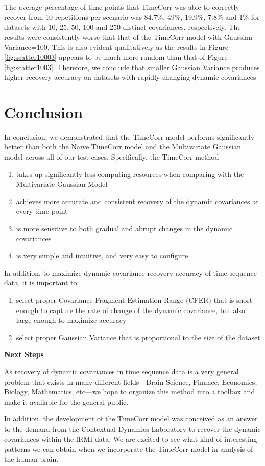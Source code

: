 \documentclass[12pt]{article}
\begin{document}
\begin{enumerate}
\begin{figure}[h]
\end{figure}
The average percentage of time points that TimeCorr was able to correctly recover from 10 repetitions per scenario was 84.7\%, 49\%, 19.9\%, 7.8\% and 1\% for datasets with 10, 25, 50, 100 and 250 distinct covariances, respectively. The results were consistently worse that that of the TimeCorr model with Gaussian Variance=100. This is also evident qualitatively as the results in Figure \ref{fig:scatter10003} appears to be much more random than that of Figure \ref{fig:scatter1003}. Therefore, we conclude that smaller Gaussian Variance produces higher recovery accuracy on datasets with rapidly changing dynamic covariances\par



\end{enumerate}

\section{Conclusion}
In conclusion, we demonstrated that the TimeCorr model performs significantly better than both the Naive TimeCorr model and the Multivariate Gaussian model across all of our test cases. Specifically, the TimeCorr method
\begin{enumerate}
\item takes up significantly less computing resources when comparing with the Multivariate Gaussian Model
\item achieves more accurate and consistent recovery of the dynamic covariances at every time point
\item is more sensitive to both gradual and abrupt changes in the dynamic covariances
\item is very simple and intuitive, and very easy to configure
\end{enumerate}
In addition, to maximize dynamic covariance recovery accuracy of time sequence data, it is important to:
\begin{enumerate}
\item select proper Covariance Fragment Estimation Range (CFER) that is short enough to capture the rate of change of the dynamic covariance, but also large enough to maximize accuracy
\item select proper Gaussian Variance that is proportional to the size of the dataset
\end{enumerate}

\textbf{Next Steps}\par
As recovery of dynamic covariances in time sequence data is a very general problem that exists in many different fields---Brain Science, Finance, Economics, Biology, Mathematics, etc---we hope to organize this method into a toolbox and make it available for the general public.\par
In addition, the development of the TimeCorr model was conceived as an answer to the demand from the Contextual Dynamics Laboratory to recover the dynamic covariances within the fRMI data. We are excited to see what kind of interesting patterns we can obtain when we incorporate the TimeCorr model in analysis of the human brain.\par
\end{document}
